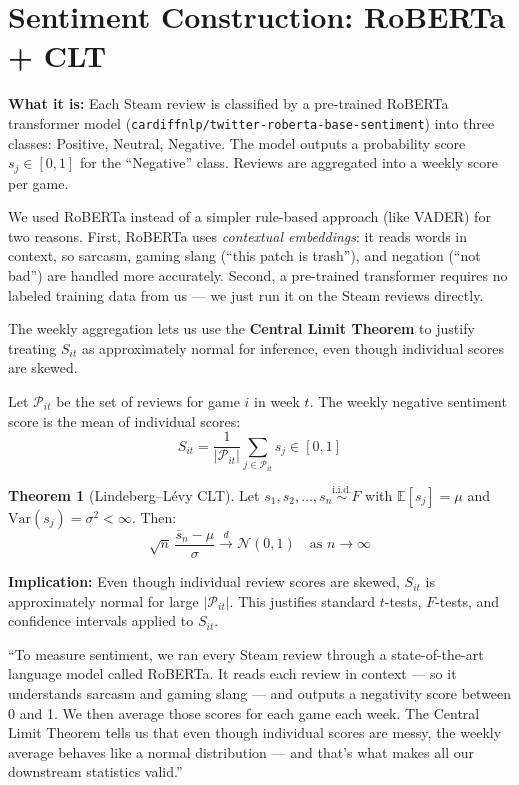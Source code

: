 \documentclass[11pt, letterpaper]{article}
\theoremstyle{definition}
\newtheorem{theorem}{Theorem}[section]
\begin{document}
\section{Sentiment Construction: RoBERTa + CLT}

\textbf{What it is:} Each Steam review is classified by a pre-trained RoBERTa transformer model (\texttt{cardiffnlp/twitter-roberta-base-sentiment}) into three classes: Positive, Neutral, Negative. The model outputs a probability score $s_j \in [0,1]$ for the ``Negative'' class. Reviews are aggregated into a weekly score per game.

\begin{whybox}
We used RoBERTa instead of a simpler rule-based approach (like VADER) for two reasons.
First, RoBERTa uses \emph{contextual embeddings}: it reads words in context, so sarcasm, gaming slang (``this patch is trash''), and negation (``not bad'') are handled more accurately.
Second, a pre-trained transformer requires no labeled training data from us --- we just run it on the Steam reviews directly.

The weekly aggregation lets us use the \textbf{Central Limit Theorem} to justify treating $S_{it}$ as approximately normal for inference, even though individual scores are skewed.
\end{whybox}

\begin{mathbox}
Let $\mathcal{P}_{it}$ be the set of reviews for game $i$ in week $t$.
The weekly negative sentiment score is the mean of individual scores:
\[
    S_{it} = \frac{1}{|\mathcal{P}_{it}|} \sum_{j \in \mathcal{P}_{it}} s_j \in [0,1]
\]

\begin{theorem}[Lindeberg--L\'evy CLT]
Let $s_1, s_2, \ldots, s_n \overset{\text{i.i.d.}}{\sim} F$ with $\mathbb{E}[s_j]=\mu$ and $\mathrm{Var}(s_j)=\sigma^2 < \infty$.
Then:
\[
    \sqrt{n}\,\frac{\bar{s}_n - \mu}{\sigma} \xrightarrow{d} \mathcal{N}(0,1) \quad \text{as } n \to \infty
\]
\end{theorem}

\textbf{Implication:} Even though individual review scores are skewed, $S_{it}$ is approximately normal for large $|\mathcal{P}_{it}|$.
This justifies standard $t$-tests, $F$-tests, and confidence intervals applied to $S_{it}$.
\end{mathbox}

\begin{speakerbox}
``To measure sentiment, we ran every Steam review through a state-of-the-art language model called RoBERTa.
It reads each review in context --- so it understands sarcasm and gaming slang --- and outputs a negativity score between 0 and 1.
We then average those scores for each game each week.
The Central Limit Theorem tells us that even though individual scores are messy, the weekly average behaves like a normal distribution --- and that's what makes all our downstream statistics valid.''
\end{speakerbox}
\end{document}
